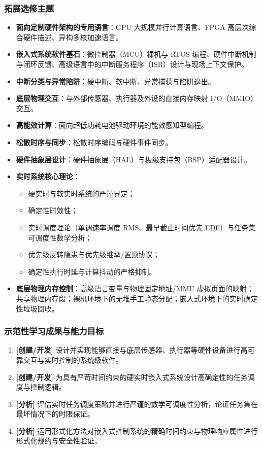 \subsubsection{拓展选修主题}
\begin{itemize}
    \item \textbf{面向定制硬件架构的专用语言}：GPU 大规模并行计算语言、FPGA 高层次综合硬件描述、异构多核加速语言。
    \item \textbf{嵌入式系统软件基石}：微控制器（MCU）裸机与 RTOS 编程、硬件中断机制与闭环反馈、高级语言中的中断服务程序（ISR）设计与现场上下文保护。
    \item \textbf{中断分类与异常陷阱}：硬中断、软中断、异常捕获与陷阱退出。
    \item \textbf{底层物理交互}：与外部传感器、执行器及外设的直接内存映射 I/O（MMIO）交互。
    \item \textbf{高能效计算}：面向超低功耗电池驱动环境的能效感知型编程。
    \item \textbf{松散时序与同步}：松散时序编码与硬件事件同步。
    \item \textbf{硬件抽象层设计}：硬件抽象层（HAL）与板级支持包（BSP）适配器设计。
    \item \textbf{实时系统核心理论}：
    \begin{itemize}
        \item 硬实时与软实时系统的严谨界定；
        \item 确定性时效性；
        \item 实时调度理论（单调速率调度 RMS、最早截止时间优先 EDF）与任务集可调度性数学分析；
        \item 优先级反转隐患与优先级继承/置顶协议；
        \item 确定性执行时延与计算抖动的严格抑制。
    \end{itemize}
    \item \textbf{底层物理内存控制}：高级语言变量与物理固定地址/MMU 虚拟页面的映射；共享物理内存段；裸机环境下的无堆手工静态分配；嵌入式环境下的实时确定性垃圾回收。
\end{itemize}

\subsubsection{示范性学习成果与能力目标}
\begin{enumerate}
    \item \textbf{[创建/开发]} 设计并实现能够直接与底层传感器、执行器等硬件设备进行高可靠交互与实时控制的系统级软件。
    \item \textbf{[创建/开发]} 为具有严苛时间约束的硬实时嵌入式系统设计高确定性的任务调度与控制逻辑。
    \item \textbf{[分析]} 评估实时任务调度策略并进行严谨的数学可调度性分析，论证任务集在最坏情况下的时限保证。
    \item \textbf{[分析]} 运用形式化方法对嵌入式控制系统的精确时间约束与物理响应属性进行形式化规约与安全性验证。
\end{enumerate}

